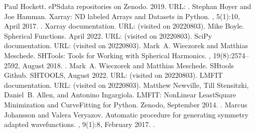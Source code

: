 \documentclass[letterpaper,table,10pt,english]{jupyterBook}
\begin{document}
\begin{sphinxthebibliography}{10}
\sphinxAtStartPar
Paul Hockett. ePSdata repositories on Zenodo. 2019. URL: .
\sphinxAtStartPar
Stephan Hoyer and Joe Hamman. Xarray: N\sphinxhyphen{}D labeled Arrays and Datasets in Python. , 5(1):10, April 2017. .
\sphinxAtStartPar
Xarray documentation. URL:  (visited on 2022\sphinxhyphen{}08\sphinxhyphen{}03).
\sphinxAtStartPar
Mike Boyle. Spherical Functions. April 2022. URL:  (visited on 2022\sphinxhyphen{}08\sphinxhyphen{}03).
\sphinxAtStartPar
SciPy documentation. URL:  (visited on 2022\sphinxhyphen{}08\sphinxhyphen{}03).
\sphinxAtStartPar
Mark A. Wieczorek and Matthias Meschede. SHTools: Tools for Working with Spherical Harmonics. , 19(8):2574–2592, August 2018. .
\sphinxAtStartPar
Mark A. Wieczorek and Matthias Meschede. SHtools Github. SHTOOLS, August 2022. URL:  (visited on 2022\sphinxhyphen{}08\sphinxhyphen{}03).
\sphinxAtStartPar
LMFIT documentation. URL:  (visited on 2022\sphinxhyphen{}08\sphinxhyphen{}03).
\sphinxAtStartPar
Matthew Newville, Till Stensitzki, Daniel B. Allen, and Antonino Ingargiola. LMFIT: Non\sphinxhyphen{}Linear Least\sphinxhyphen{}Square Minimization and Curve\sphinxhyphen{}Fitting for Python. Zenodo, September 2014. .
\sphinxAtStartPar
Marcus Johansson and Valera Veryazov. Automatic procedure for generating symmetry adapted wavefunctions. , 9(1):8, February 2017. .

\end{sphinxthebibliography}
\end{document}

